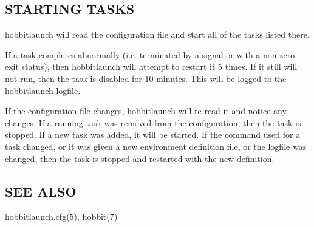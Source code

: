 \subsection{STARTING TASKS}  hobbitlaunch will read the configuration
 file and start all of the tasks listed there. 


  If a task completes abnormally (i.e. terminated by a signal or with
  a non-zero exit status), then hobbitlaunch will attempt to restart
  it 5 times. If it still will not run, then the task is disabled for
  10 minutes. This will be logged to the hobbitlaunch logfile. 


  If the configuration file changes, hobbitlaunch will re-read it and
  notice any changes. If a running task was removed from the
  configuration, then the task is stopped. If a new task was added, it
  will be started. If the command used for a task changed, or it was
  given a new environment definition file, or the logfile was changed,
  then the task is stopped and restarted with the new definition. 



 
\subsection{SEE ALSO}
hobbitlaunch.cfg(5), hobbit(7) 
